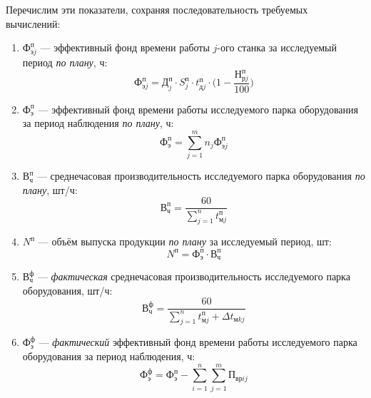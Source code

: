 Перечислим эти показатели, сохраняя последовательность требуемых вычислений:

\begin{enumerate}

  \item $ \text{Ф}^{\text{п}}_{\text{э}j} $ --- эффективный фонд времени работы $j$-ого станка
    за исследуемый период \textit{по плану}, ч:
    \begin{equation*}
      \text{Ф}^{\text{п}}_{\text{э}j} =
      \text{Д}^{\text{п}}_j \cdot S^{\text{п}}_j
      \cdot t^{\text{п}}_{\text{д}j} \cdot \Big(1 - \dfrac{\text{Н}^{\text{п}}_{\text{р}j}}{100} \Big)
    \end{equation*}

  \item $ \text{Ф}^{\text{п}}_{\text{э}} $ --- эффективный фонд времени работы исследуемого парка
    оборудования за период наблюдения \textit{по плану}, ч:
    \begin{equation*}
      \text{Ф}^{\text{п}}_{\text{э}} = 
      \sum\limits_{j=1}^{m}n_j \text{Ф}^{\text{п}}_{\text{э}j}
    \end{equation*}

  \item $ \text{В}^{\text{п}}_{\text{ч}} $ --- среднечасовая производительность исследуемого парка
    оборудования \textit{по плану}, шт/ч:
    \begin{equation*}
      \text{В}^{\text{п}}_{\text{ч}} = 
      \dfrac{60}{\sum\limits_{j=1}^{n} t^{\text{п}}_{\text{м}j}}
    \end{equation*}

  \item $ N^{\text{п}} $ --- объём выпуска продукции \textit{по плану} за исследуемый период, шт:
    \begin{equation*}
      N^{\text{п}} = \text{Ф}^{\text{п}}_{\text{э}} \cdot \text{В}^{\text{п}}_{\text{ч}}
    \end{equation*}

  \item $ \text{В}^{\text{ф}}_{\text{ч}} $ --- \textit{фактическая} среднечасовая производительность
    исследуемого парка оборудования, шт/ч:
    \begin{equation*}
      \text{В}^{\text{ф}}_{\text{ч}} = 
      \dfrac{60}{\sum\limits_{j=1}^{n} t^{\text{п}}_{\text{м}j} + \Delta t_{\text{м}kj}}
    \end{equation*}

  \item $ \text{Ф}^{\text{ф}}_{\text{э}} $ --- \textit{фактический} эффективный фонд времени работы 
    исследуемого парка оборудования за период наблюдения, ч:
    \begin{equation*}
      \text{Ф}^{\text{ф}}_{\text{э}} = 
      \text{Ф}^{\text{п}}_{\text{э}} - \sum\limits_{i=1}^{n}\sum\limits_{j=1}^{m} \text{П}_{\text{вр}ij}
    \end{equation*}


\end{enumerate}
